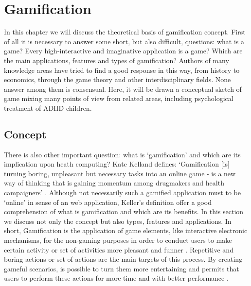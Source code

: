 \chapter{Gamification}
\label{ch:gamification}


In this chapter we will discuss the theoretical basis of gamification concept. First of all it is necessary to answer some short, but also difficult, questions: what is a game? Every high-interactive and imaginative application is a game? Which are the main applications, features and types of gamification? Authors of many knowledge areas have tried to find a good response in this way, from history to economics, through the game theory and other interdisciplinary fields. None answer among them is consensual. Here, it will be drawn a conceptual sketch of game mixing many points of view from related areas, including psychological treatment of ADHD children.


\section{Concept}

There is also other important question: what is `gamification' and which are its implication upon heath computing? Kate Kelland defines: `Gamification [is] turning boring, unpleasant but necessary tasks into an online game - is a new way of thinking that is gaining momentum among drugmakers and health campaigners' \citep{gamehealth}. Although not necessarily such a gamified application must to be `online' in sense of an web application, Keller's definition offer a good comprehension of what is gamification and which are its benefits. In this section we discuss not only the concept but also types, features and applications. In short, Gamification is the application of game elements, like interactive electronic mechanisms, for the non-gaming purposes in order to conduct users to make certain activity or set of activities more pleasant and funner \citep{2212883,Huotari,Zich}. Repetitive and boring actions or set of actions are the main targets of this process. By creating gameful scenarios, is possible to turn them more entertaining and permits that users to perform these actions for more time and with better performance  \citep{2212883,Huotari}. 

